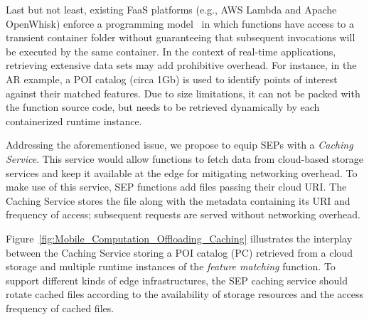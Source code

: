 Last but not least, existing FaaS platforms (e.g., AWS Lambda and Apache OpenWhisk) enforce a programming model~\cite{AWSLambda,OpenWhisk} in which functions have access to a transient container folder without guaranteeing that subsequent invocations will be executed by the same container. %
In the context of real-time applications, retrieving extensive data sets may add prohibitive overhead. For instance, in the AR example, a POI catalog (circa 1Gb) is used to identify points of interest against their matched features. Due to size limitations, it can not be packed with the function source code, but needs to be retrieved dynamically by each containerized runtime instance.

Addressing the aforementioned issue, we propose to equip SEPs with a \textit{Caching Service}. This service would allow functions to fetch data from cloud-based storage services and keep it available at the edge for mitigating networking overhead. 
To make use of this service, SEP functions add files passing their cloud URI.
The Caching Service stores the file along with the metadata containing its URI and frequency of access; subsequent requests are served without networking overhead. 

Figure~\ref{fig:Mobile_Computation_Offloading_Caching} illustrates the interplay between the Caching Service storing a POI catalog (PC) retrieved from a cloud storage and multiple runtime instances of the \textit{feature matching} function.
To support different kinds of edge infrastructures, the SEP caching service should rotate cached files according to the availability of storage resources and the access frequency of cached files. %


